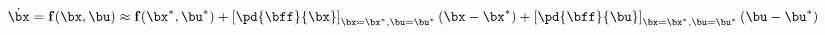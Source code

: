 \documentclass[preview]{standalone}
\begin{document}
\begin{align*}
\dot\bx = {\bf f}(\bx,\bu) \approx  {\bf f}(\bx^*,\bu^*)  +  \left[ \pd{\bff}{\bx}\right]_{\bx=\bx^*,\bu=\bu^*} (\bx - \bx^*)  + \left[ \pd{\bff}{\bu}\right]_{\bx=\bx^*,\bu=\bu^*} (\bu - \bu^*)
\end{align*}
\end{document}
